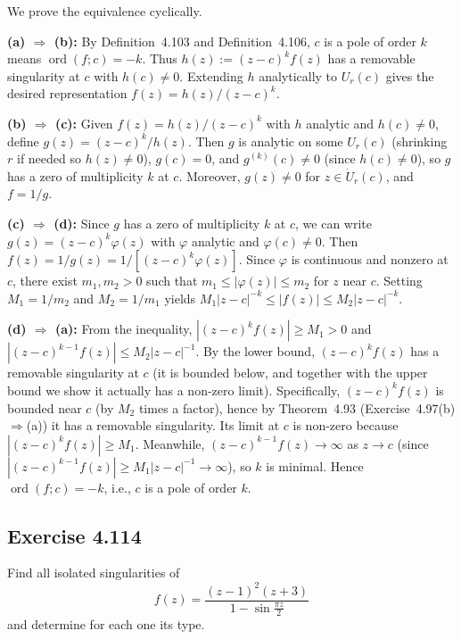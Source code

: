 \documentclass{article}
\begin{document}
\begin{solution}
  We prove the equivalence cyclically.

  \medskip
  \noindent\textbf{(a) $\Rightarrow$ (b):}
  By Definition~4.103 and Definition~4.106, $c$ is a pole of order $k$ means
  $\operatorname{ord}(f; c) = -k$. Thus $h(z) := (z-c)^k f(z)$ has a removable
  singularity at $c$ with $h(c) \ne 0$. Extending $h$ analytically to $U_r(c)$
  gives the desired representation $f(z) = h(z)/(z-c)^k$.

  \medskip
  \noindent\textbf{(b) $\Rightarrow$ (c):}
  Given $f(z) = h(z)/(z-c)^k$ with $h$ analytic and $h(c) \ne 0$, define
  $g(z) = (z-c)^k/h(z)$. Then $g$ is analytic on some $U_r(c)$ (shrinking $r$
  if needed so $h(z) \ne 0$), $g(c) = 0$, and $g^{(k)}(c) \ne 0$ (since
  $h(c) \ne 0$), so $g$ has a zero of multiplicity $k$ at $c$. Moreover,
  $g(z) \ne 0$ for $z \in \dot{U}_r(c)$, and $f = 1/g$.

  \medskip
  \noindent\textbf{(c) $\Rightarrow$ (d):}
  Since $g$ has a zero of multiplicity $k$ at $c$, we can write
  $g(z) = (z-c)^k \varphi(z)$ with $\varphi$ analytic and $\varphi(c) \ne 0$.
  Then $f(z) = 1/g(z) = 1/[(z-c)^k \varphi(z)]$. Since $\varphi$ is continuous
  and nonzero at $c$, there exist $m_1, m_2 > 0$ such that
  $m_1 \le |\varphi(z)| \le m_2$ for $z$ near $c$. Setting $M_1 = 1/m_2$ and
  $M_2 = 1/m_1$ yields $M_1 |z-c|^{-k} \le |f(z)| \le M_2 |z-c|^{-k}$.

  \medskip
  \noindent\textbf{(d) $\Rightarrow$ (a):}
  From the inequality, $|(z-c)^k f(z)| \ge M_1 > 0$ and
  $|(z-c)^{k-1} f(z)| \le M_2 |z-c|^{-1}$. By the lower bound, $(z-c)^k f(z)$
  has a removable singularity at $c$ (it is bounded below, and together with the
  upper bound we show it actually has a non-zero limit). Specifically,
  $(z-c)^k f(z)$ is bounded near $c$ (by $M_2$ times a factor), hence by
  Theorem~4.93 (Exercise~4.97(b)$\Rightarrow$(a)) it has a removable singularity.
  Its limit at $c$ is non-zero because $|(z-c)^k f(z)| \ge M_1$.
  Meanwhile, $(z-c)^{k-1} f(z) \to \infty$ as $z \to c$ (since
  $|(z-c)^{k-1} f(z)| \ge M_1 |z-c|^{-1} \to \infty$), so $k$ is minimal.
  Hence $\operatorname{ord}(f; c) = -k$, i.e., $c$ is a pole of order $k$.
\end{solution}

\subsection{Exercise 4.114}

Find all isolated singularities of
\[
  f(z) = \frac{(z-1)^2(z+3)}{1 - \sin\frac{\pi z}{2}}
\]
and determine for each one its type.
\end{document}
